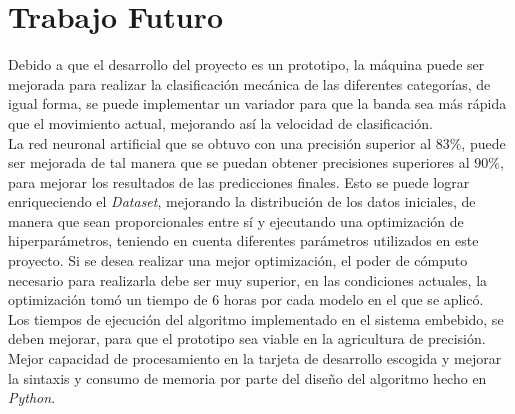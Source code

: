 \chapter{Trabajo Futuro}

Debido a que el desarrollo del proyecto es un prototipo, la máquina puede ser mejorada para realizar la clasificación mecánica de las diferentes categorías, de igual forma, se puede implementar un variador para que la banda sea más rápida que el movimiento actual, mejorando así la velocidad de clasificación.\\

La red neuronal artificial que se obtuvo con una precisión superior al $83\%$, puede ser mejorada de tal manera que se puedan obtener precisiones superiores al $90\%$, para mejorar los resultados de las predicciones finales. Esto se puede lograr enriqueciendo el \textit{Dataset}, mejorando la distribución de los datos iniciales, de manera que sean proporcionales entre sí y ejecutando una optimización de hiperparámetros, teniendo en cuenta diferentes parámetros utilizados en este proyecto. Si se desea realizar una mejor optimización, el poder de cómputo necesario para realizarla debe ser muy superior, en las condiciones actuales, la optimización tomó un tiempo de $6$ horas por cada modelo en el que se aplicó.\\

Los tiempos de ejecución del algoritmo implementado en el sistema embebido, se deben mejorar, para que el prototipo sea viable en la agricultura de precisión. Mejor capacidad de procesamiento en la tarjeta de desarrollo escogida y mejorar la sintaxis y consumo de memoria por parte del diseño del algoritmo hecho en \textit{Python}.










